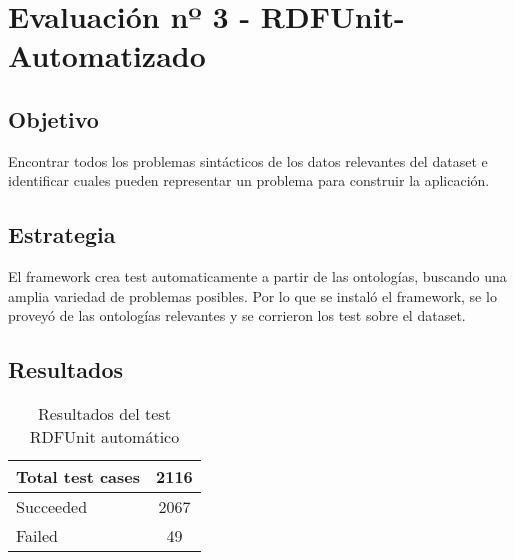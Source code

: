 \section{Evaluación nº 3 - RDFUnit-Automatizado}
\label{section:evaluacion-automatizado}

\subsection*{Objetivo}
Encontrar todos los problemas sintácticos de los datos relevantes del dataset e identificar cuales pueden representar un problema 
para construir la aplicación.

\subsection*{Estrategia}
El framework crea test automaticamente a partir de las ontologías, buscando una amplia variedad de problemas posibles. Por lo que se 
instaló el framework, se lo proveyó de las ontologías relevantes y se corrieron los test sobre el dataset.

\subsection*{Resultados}
\begin{table}[h]
\begin{tabular}{| l | c | }\hline
Total test cases & 2116\\\hline
Succeeded & 2067\\
Failed & 49\\\hline
\end{tabular}
\caption{Resultados del test RDFUnit automático}
\label{table:RDFUnitAutomatic}
\end{table}


